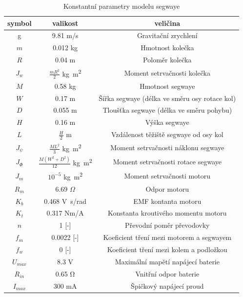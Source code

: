 \documentclass[conference]{IEEEtran}
\begin{document}
\begin{table}[htbp]
    \centering
    \begin{tabular}[t]{|c|c|c|}
        \hline
        symbol & valikost & veličina \\\hline
        g  & 9.81 \si{m/s} & Gravitační zrychlení \\\hline
        $ m $ & 0.012 \si{kg} & Hmotnost kolečka \\\hline
        $ R $ & 0.04 \si{m }& Poloměr kolečka \\\hline
        $ J_w $ & $\frac{mR^2}{2}$ \si{kg . m^2} & Moment setrvačnosti kolečka \\\hline
        $ M $ & 0.58   \si{kg} & Hmotnost segwaye \\\hline
        $ W $ & 0.17  \si{ m} & Šířka segwaye (délka ve směru osy rotace kol) \\\hline
        $ D $ & 0.055  \si{ m} & Tloušťka segwaye (délka ve směru pohybu) \\\hline
        $ H $ & 0.16 \si{m }& Výška  segwaye \\\hline
        $ L $ & $\frac{H}{2}$ \si{m} & Vzdálenost těžiště segwaye od osy kol \\\hline
        $ J_\psi $ & $\frac{ML^2}{3}$ \si{kg . m^2} & Moment setrvačnosti náklonu segwaye\\\hline
        $ J_\varPhi $ & $\frac{M(W^2 + D^2)}{12}$ \si{kg . m^2} & Moment setrvačnosti rotace segwaye \\\hline
        $ J_m $ & $10^{-5}$ \si{kg . m^2} & Moment setrvačnosti motoru \\\hline
        $ R_m $ & 6.69 $\Omega$ & Odpor motoru \\\hline
        $ K_b $ & 0.468 \si{V.s/rad} & EMF kontanta motoru \\\hline
        $ K_t $ & 0.317 \si{Nm/A} & Konstanta kroutivého momentu motoru \\\hline
        $ n $ & 1 [-] & Převodní poměr převodovky \\\hline
        $ f_m $ & 0.0022 [-] & Koeficient tření mezi motorem a segwayem \\\hline
        $ f_w $ & 0 [-] & Koeficient tření mezi kolem a podložkou \\\hline
        $ U_{max} $ & 8.3 \si{V} & Maximální mapětí napájecí baterie \\\hline
        $ R_{in} $ & 0.65 \si{\ohm} & Vnitřní odpor baterie \\\hline
        $ I_{max} $ & 300 \si{\milli\ampere} & Špičkový napájecí proud \\\hline
        
    \end{tabular}
    \caption{Konstantní parametry modelu segwaye}
    \label{tab:konstanty}
\end{table}
\end{document}
